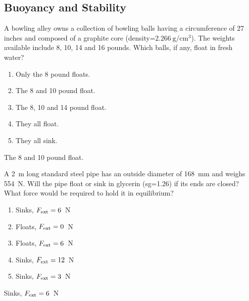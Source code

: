 \documentclass[multi,preview,varwidth=false,border=5,12pt]{standalone}
\begin{document}
\begin{center}
\section*{Buoyancy and Stability}
\end{center}

\begin{question}

A bowling alley owns a collection of bowling balls having a circumference of 27 inches and composed of a graphite core (density=$2.266~\textrm{g}/\textrm{cm}^3$).  The weights available include 8, 10, 14 and 16 pounds.  Which balls, if any, float in fresh water?

\begin{enumerate}
  \item Only the 8 pound floats.
  \item The 8 and 10 pound float.
  \item The 8, 10 and 14 pound float.
  \item They all float.
  \item They all sink.
\end{enumerate}

\begin{solution}
    The 8 and 10 pound float.
\end{solution}

\end{question}


\begin{question}

A 2~m long standard steel pipe has an outside diameter of 168~mm and weighs 554~N.  Will the pipe float or sink in glycerin (sg=1.26) if its ends are closed?  What force would be required to hold it in equilibrium?

\begin{enumerate}
  \item Sinks, $F_{\rm ext}=6$~N
  \item Floats, $F_{\rm ext}=0$~N
  \item Floats, $F_{\rm ext}=6$~N
  \item Sinks, $F_{\rm ext}=12$~N
  \item Sinks, $F_{\rm ext}=3$~N
\end{enumerate}

\begin{solution}
    Sinks, $F_{\rm ext}=6$~N
\end{solution}

\end{question}
\end{document}
